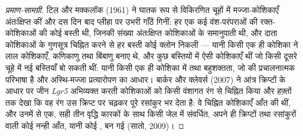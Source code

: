 \begin{proof}[प्रमाण-सामग्री]
टिल और मक्कलॉक (1961) ने घातक रूप से विकिरणित चूहों में मज्जा-कोशिकाएँ
अंतःक्षिप्त कीं और दस दिन बाद प्लीहा पर उभरी गाँठें गिनीं: हर एक कई
वंश-परंपराओं की रक्त-कोशिकाओं की कोई बस्ती थी, जिनकी संख्या अंतःक्षिप्त
कोशिकाओं के समानुपाती थी, और दाता कोशिकाओं के गुणसूत्र चिह्नित करने से
हर बस्ती कोई क्लोन निकली --- यानी किसी एक ही कोशिका ने लाल कोशिकाएँ,
कणिकाणु तथा बिंबाणु बनाए थे, और कुछ बस्तियों में ऐसी कोशिकाएँ थीं जो
किसी दूसरे चूहे में नई बस्तियाँ बो सकती थीं: यानी किसी एक ही कोशिका में
 तथा बहुशक्तता, जो  की प्रचालनात्मक परिभाषा है और
अस्थि-मज्जा प्रत्यारोपण का आधार। बार्कर और क्लेवर्स (2007) ने आंत्र
क्रिप्टों के आधार पर जीन \emph{Lgr5} अभिव्यक्त करती कोशिकाओं को किसी
वंशागत रंग से चिह्नित किया और हफ़्तों तक देखा कि वह रंग उस क्रिप्ट पर
चढ़कर पूरे रसांकुर भर देता है: वे चिह्नित कोशिकाएँ आँत की 
थीं, और उनमें से एक, सही तीन वृद्धि कारकों के साथ किसी जेल में संवर्धित,
अपने ही क्रिप्टों तथा रसांकुरों वाली कोई नन्ही आँत, यानी कोई
\emph{}, बन गई (सातो, 2009)।
\end{proof}

